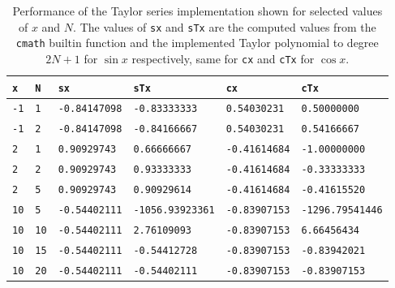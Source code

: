 \documentclass[a4paper,10pt]{article}
\begin{document}
\begin{table}[!ht]
\centering 
  \begin{minipage}[t]{105mm}
    \caption{
      Performance of the Taylor series implementation shown for selected values of 
      $x$ and $N$. The values of \texttt{sx} and \texttt{sTx} are the computed values
      from the \texttt{cmath} builtin function and the implemented Taylor polynomial to degree $2N+1
      $ for $\sin x$
      respectively,
      same for \texttt{cx} and \texttt{cTx} for $\cos x$.
    } 
    \label{TABtask1}
  \end{minipage}

  \vspace{5mm}
  \begin{tabular}{l l l l l l} 
    \texttt{x}&\texttt{N}&\texttt{sx} & \texttt{sTx} & \texttt{cx} & \texttt{cTx} \\
    \hline
    \texttt{-1}	& \texttt{1}	
    & \texttt{-0.84147098} & \texttt{-0.83333333} & \texttt{0.54030231} & \texttt{0.50000000}	\\
    \texttt{-1}	& \texttt{2}	
    & \texttt{-0.84147098} & \texttt{-0.84166667} & \texttt{0.54030231} & \texttt{0.54166667}	\\
    \hline
    \texttt{2}	& \texttt{1}	
    & \texttt{0.90929743} & \texttt{0.66666667} & \texttt{-0.41614684} & \texttt{-1.00000000}	\\
    \texttt{2}	& \texttt{2}	
    & \texttt{0.90929743} & \texttt{0.93333333} & \texttt{-0.41614684} & \texttt{-0.33333333}	\\
    \texttt{2}	& \texttt{5}	
    & \texttt{0.90929743} & \texttt{0.90929614} & \texttt{-0.41614684} & \texttt{-0.41615520}	\\
    \hline
    \texttt{10}	& \texttt{5}	
    & \texttt{-0.54402111} & \texttt{-1056.93923361} &\texttt{-0.83907153}&\texttt{-1296.79541446}\\
    \texttt{10}	& \texttt{10}	
    & \texttt{-0.54402111} & \texttt{2.76109093} & \texttt{-0.83907153} & \texttt{6.66456434}	\\
     \texttt{10}	& \texttt{15}	
    & \texttt{-0.54402111} & \texttt{-0.54412728} & \texttt{-0.83907153} & \texttt{-0.83942021}	\\
     \texttt{10}	& \texttt{20}	
    & \texttt{-0.54402111} & \texttt{-0.54402111} & \texttt{-0.83907153} & \texttt{-0.83907153}	\\
 
 

  \end{tabular}
\end{table}
\end{document}
